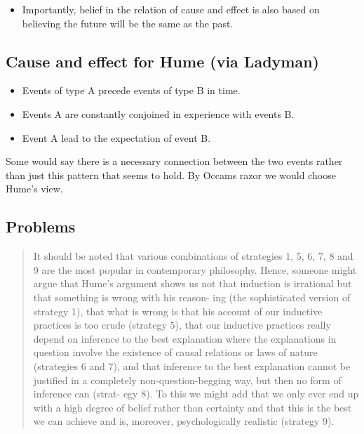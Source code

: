 \documentclass[11pt]{article}
\begin{document}
\begin{itemize}
\tightlist
\item
  Importantly, belief in the relation of cause and effect is also based
  on believing the future will be the same as the past.
\end{itemize}

\hypertarget{cause-and-effect-for-hume-via-ladyman}{%
\subsection{Cause and effect for Hume (via
Ladyman)}\label{cause-and-effect-for-hume-via-ladyman}}

\begin{itemize}
\tightlist
\item
  Events of type A precede events of type B in time.
\item
  Events A are constantly conjoined in experience with events B.
\item
  Event A lead to the expectation of event B.
\end{itemize}

Some would say there is a necessary connection between the two events
rather than just this pattern that seems to hold. By Occams razor we
would choose Hume's view.

\hypertarget{problems}{%
\subsection{Problems}\label{problems}}

\begin{quote}
It should be noted that various combinations of strategies 1, 5, 6, 7, 8
and 9 are the most popular in contemporary philosophy. Hence, someone
might argue that Hume's argument shows us not that induction is
irrational but that something is wrong with his reason- ing (the
sophisticated version of strategy 1), that what is wrong is that his
account of our inductive practices is too crude (strategy 5), that our
inductive practices really depend on inference to the best explanation
where the explanations in question involve the existence of causal
relations or laws of nature (strategies 6 and 7), and that inference to
the best explanation cannot be justified in a completely
non-question-begging way, but then no form of inference can (strat- egy
8). To this we might add that we only ever end up with a high degree of
belief rather than certainty and that this is the best we can achieve
and is, moreover, psychologically realistic (strategy 9).
\end{quote}
\end{document}
